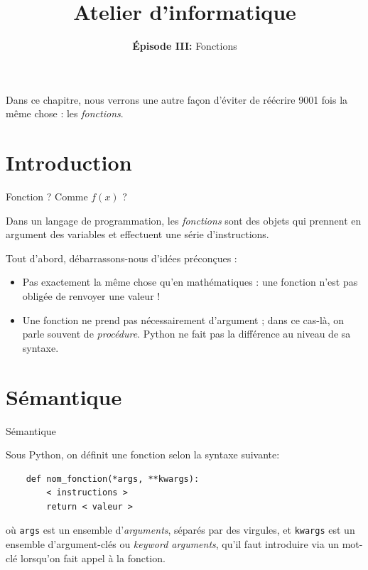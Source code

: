 \documentclass[10pt,xcolor={dvipsnames}]{beamer}
\title{Atelier d'informatique}
\subtitle{\textbf{Épisode III:} Fonctions}
\begin{document}
\begin{frame}
\titlepage
\pause

Dans ce chapitre, nous verrons une autre façon d'éviter de réécrire 9001 fois la même chose : les \textit{fonctions}.
\end{frame}

\frame{\tableofcontents}

\section{Introduction}

\begin{frame}[fragile]{Fonction ? Comme $f(x)$ ?}

Dans un langage de programmation, les \textit{fonctions} sont des objets qui prennent en argument des variables et effectuent une série d'instructions.
\pause
\vspace{1em}

Tout d'abord, débarrassons-nous d'idées préconçues :
\pause

\begin{itemize}[<+->]
\item Pas exactement la même chose qu'en mathématiques : une fonction n'est pas obligée de renvoyer une valeur !
\item Une fonction ne prend pas nécessairement d'argument ; dans ce cas-là, on parle souvent de \textit{procédure}. Python ne fait pas la différence au niveau de sa syntaxe.
\end{itemize}

\end{frame}

\section{Sémantique}

\begin{frame}[fragile]{Sémantique}

	Sous Python, on définit une fonction selon la syntaxe suivante:\pause
	\begin{lstlisting}
	def nom_fonction(*args, **kwargs):
	    < instructions >
	    return < valeur >
	    \end{lstlisting}
	\pause
	où \lstinline|args| est un ensemble d'\textit{arguments}, séparés par des virgules, et \lstinline|kwargs| est un ensemble d'argument-clés ou \textit{keyword arguments}, qu'il faut introduire via un mot-clé lorsqu'on fait appel à la fonction.
\end{frame}
\end{document}
